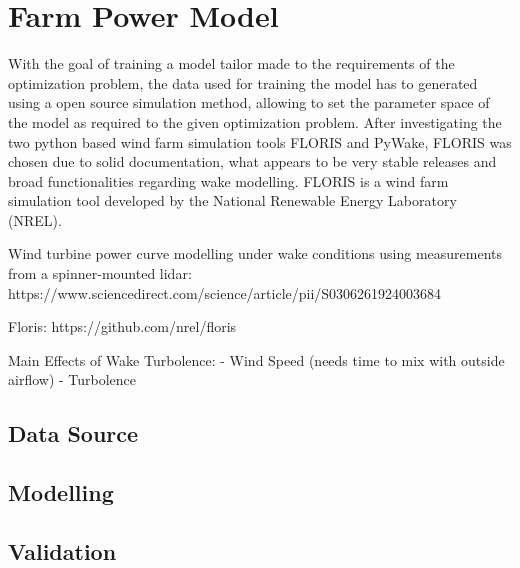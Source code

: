 
\chapter{Farm Power Model}\label{chapter:power_model}

With the goal of training a model tailor made to the requirements of the optimization problem, the data used for training the model has to generated using a open source simulation method, allowing to set the parameter space of the model as required to the given optimization problem. After investigating the two python based wind farm simulation tools FLORIS and PyWake, FLORIS was chosen due to solid documentation, what appears to be very stable releases and broad functionalities regarding wake modelling. FLORIS is a wind farm simulation tool developed by the National Renewable Energy Laboratory (NREL).



Wind turbine power curve modelling under wake conditions using measurements from a spinner-mounted lidar:
https://www.sciencedirect.com/science/article/pii/S0306261924003684

Floris:
https://github.com/nrel/floris



Main Effects of Wake Turbolence: 
- Wind Speed (needs time to mix with outside airflow)
- Turbolence
\section{Data Source}

\section{Modelling}

\section{Validation}